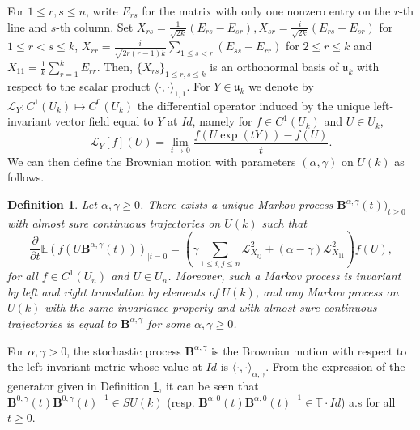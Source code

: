 \documentclass[10pt,11pt]{amsart}%
\newtheorem{definition}[theorem]{Definition}
\begin{document}
For $1\leq r,s\leq n$, write $E_{rs}$ for the matrix with only one nonzero entry on the $r$-th line and $s$-th column. Set $X_{rs}=\frac{1}{\sqrt{2 k}}
(E_{rs}-E_{sr}), X_{sr}=\frac{i}{\sqrt{2 k}}(E_{rs}+E_{sr})$ for $1\leq r<s\leq k$, $X_{rr}=\frac{i}{\sqrt{2 r(r-1) k}}\sum_{1\leq s< r}(E_{ss}-E_{rr})$ for $2\leq r\leq k$ and $X_{11}=\frac{1}{k}\sum_{r=1}^kE_{rr}$. Then, $\{X_{rs}\}_{1\leq r,s\leq k}$ is an orthonormal basis of $\mathfrak{u}_k$ with respect to the scalar product $\langle \cdot,\cdot\rangle_{1,1}$. For $Y\in \mathfrak{u}_k$ we denote by $\mathcal{L}_Y:C^1(U_k)\mapsto C^0(U_k)$ the differential operator induced by the unique left-invariant vector field equal to $Y$ at $Id$, namely for $f\in C^1(U_k)$ and $U\in U_k$,
$$\mathcal{L}_{Y}[f](U)=\lim_{t\rightarrow 0}\frac{f(U\exp(tY))-f(U)}{t}.$$
We can then define the Brownian motion with parameters $(\alpha,\gamma)$ on $U(k)$ as follows.
\begin{definition}\label{def:brownian_un}
Let $\alpha,\gamma\geq  0$. There exists a unique Markov process $\mathbf{B}^{\alpha,\gamma}(t))_{t\geq 0}$ with almost sure continuous trajectories on $U(k)$ such that 
$$\frac{\partial}{\partial t}\mathbb{E}(f(U\mathbf{B}^{\alpha,\gamma}(t)))_{\vert t=0}=\left(\gamma\sum_{1\leq i,j\leq n}\mathcal{L}_{X_{ij}}^2+(\alpha-\gamma)\mathcal{L}_{X_{11}}^2\right)f(U),$$
for all $f\in C^1(U_n)$ and $U\in U_n$. 
Moreover, such a Markov process is invariant by left and right translation by elements of $U(k)$, and any Markov process on $U(k)$ with the same invariance property and with almost sure continuous trajectories is equal to $\mathbf{B}^{\alpha,\gamma}$ for some $\alpha,\gamma\geq 0$.
\end{definition}
For $\alpha,\gamma>0$, the stochastic process $\mathbf{B}^{\alpha,\gamma}$ is the Brownian motion with respect to the left invariant metric whose value at $Id$ is $\langle\cdot,\cdot\rangle_{\alpha,\gamma}$. From the expression of the generator given in Definition \ref{def:brownian_un}, it can be seen that $\mathbf{B}^{0,\gamma}(t)\mathbf{B}^{0,\gamma}(t)^{-1}\in SU(k)$  (resp. $\mathbf{B}^{\alpha,0}(t)\mathbf{B}^{\alpha,0}(t)^{-1}\in\mathbb{T}\cdot Id$) a.s for all $t\geq 0$. 
\end{document}
